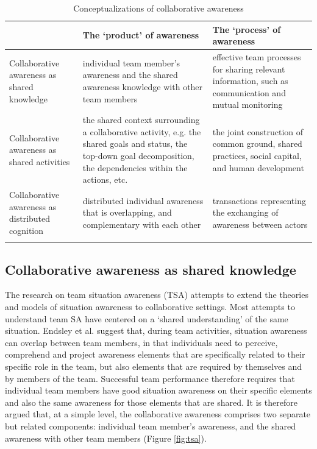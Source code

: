{
   \footnotesize
   \begin{longtable}{>{\raggedright}p{1.1in}>{\raggedright}p{2.2in}>{\raggedright}p{2.2in}}
   \toprule 
    & \textbf{The `product' of awareness} & \textbf{The `process' of awareness}\tabularnewline
   \midrule 
   Collaborative awareness as shared knowledge & individual team member\textquoteright{}s awareness and the shared
   awareness knowledge with other team members & effective team processes for sharing relevant information, such as
   communication and mutual monitoring\tabularnewline
   \midrule 
   Collaborative awareness as shared activities & the shared context surrounding a collaborative activity, e.g. the shared
   goals and status, the top-down goal decomposition, the dependencies
   within the actions, etc. & the joint construction of common ground, shared practices, social
   capital, and human development\tabularnewline
   \midrule 
   Collaborative awareness as distributed cognition & distributed individual awareness that is overlapping, and complementary
   with each other & transactions representing the exchanging of awareness between actors\tabularnewline
   \bottomrule
   \caption{Conceptualizations of collaborative awareness}
   \label{tab:collaborative_awareness}

\end{longtable}

}

\subsection{Collaborative awareness as shared knowledge} %
\label{sub:team_situation_awareness}
The research on team situation awareness (TSA) attempts to extend the theories and models of situation awareness to collaborative settings. Most attempts to understand team SA have centered on a `shared understanding' of the same situation. Endsley et al. \cite{endsley2001model} suggest that, during team activities, situation awareness can overlap between team members, in that individuals need to perceive, comprehend and project awareness elements that are specifically related to their specific role in the team, but also elements that are required by themselves and by members of the team. Successful team performance therefore requires that individual team members have good situation awareness on their specific elements and also the same awareness for those elements that are shared. It is therefore argued that, at a simple level, the collaborative awareness comprises two separate but related components: individual team member's awareness, and the shared awareness with other team members (Figure \ref{fig:tsa}). 

